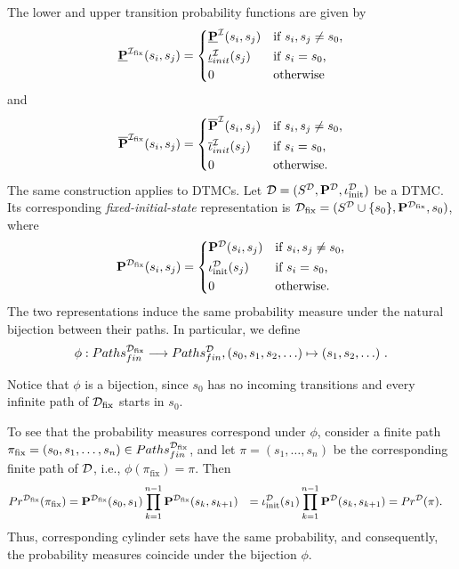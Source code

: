 The lower and upper transition probability functions are given by
\[
\PFlower^{\IMC_{\mathrm{fix}}}(s_i,s_j)
=
\begin{cases*}
    \PFlower^\IMC(s_i,s_j)
        & if $s_i,s_j\neq s_{0}$,\\
    \Initlower^\IMC(s_j)
        & if $s_i=s_{0}$,\\
    0 & otherwise
\end{cases*}
\]
and
\[
\PFupper^{\IMC_{\mathrm{fix}}}(s_i,s_j)
=
\begin{cases*}
    \PFupper^\IMC(s_i,s_j)
        & if $s_i,s_j\neq s_{0}$,\\
    \Initupper^\IMC(s_j)
        & if $s_i=s_{0}$,\\
    0 & otherwise.
\end{cases*}
\]
The same construction applies to DTMCs. Let $\mathcal{D}=(S^{\mathcal{D}},\mathbf{P}^{\mathcal{D}},\iota^{\mathcal{D}}_{\mathrm{init}})$ be a DTMC. Its corresponding \textit{fixed-initial-state} representation is $\mathcal{D}_{\mathrm{fix}} = (S^{\mathcal{D}}\cup\{s_{0}\},\mathbf{P}^{\mathcal{D}_{\mathrm{fix}}},s_{0})$, where
\[
    \PF^{\MC_{\mathrm{fix}}}(s_i,s_j)
    =
    \begin{cases*}
        \PF^\MC(s_i,s_j)
            & if $s_i,s_j\neq s_{0}$,\\
        \iota^\MC_{\mathrm{init}}(s_j)
            & if $s_i=s_{0}$,\\
        0 & otherwise.
    \end{cases*}
\]
The two representations induce the same probability measure under the natural bijection between their paths. In particular, we define
\[
    \phi: Paths_{fin}^{\mathcal{D}_{\mathrm{fix}}} \longrightarrow Paths_{fin}^{\mathcal{D}}, (s_{0},s_1,s_2,\ldots) \mapsto (s_1,s_2,\ldots)\ .
\]

Notice that $\phi$ is a bijection, since $s_{0}$ has no incoming transitions and every infinite path of $\mathcal{D}_{\mathrm{fix}}$ starts in $s_{0}$.

To see that the probability measures correspond under $\phi$, consider a finite path $\pi_{\mathrm{fix}} = (s_{0},s_1,\ldots,s_n)\in Paths_{fin}^{\mathcal{D}_{\mathrm{fix}}}$, and let $\pi=(s_1,\ldots,s_n)$ be the corresponding finite path of $\mathcal{D}$, i.e., $\phi(\pi_{\mathrm{fix}}) = \pi$. Then
\begin{align}
Pr^{\mathcal{D}_{\mathrm{fix}}}(\pi_{\mathrm{fix}}) 
&= \mathbf{P}^{\mathcal{D}_{\mathrm{fix}}}(s_{0},s_1) \prod_{k=1}^{n-1} \mathbf{P}^{\mathcal{D}_{\mathrm{fix}}}(s_k,s_{k+1}) \notag
&= \iota^{\mathcal{D}}_{\mathrm{init}}(s_1) \prod_{k=1}^{n-1} \mathbf{P}^{\mathcal{D}}(s_k,s_{k+1}) \notag
&= Pr^{\mathcal{D}}(\pi).
\end{align}
Thus, corresponding cylinder sets have the same probability, and consequently, the probability measures coincide under the bijection $\phi$.

